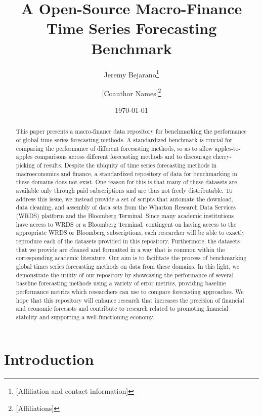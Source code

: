 \documentclass{article}
\title{A Open-Source Macro-Finance Time Series Forecasting Benchmark}
\author{Jeremy Bejarano\thanks{[Affiliation and contact information]} \and [Coauthor Names]\thanks{[Affiliations]}}
\date{\today}
\begin{document}
\maketitle

\begin{abstract}
This paper presents a macro-finance data repository for benchmarking the
performance of global time series forecasting methods. A standardized benchmark
is crucial for comparing the performance of different forecasting methods, so as
to allow apples-to-apples comparisons across different forecasting methods and
to discourage cherry-picking of results. Despite the ubiquity of time series
forecasting methods in macroeconomics and finance, a standardized repository of
data for benchmarking in these domains does not exist. One reason for this is
that many of these datasets are available only through paid subscriptions and
are thus not freely distributable. To address this issue, we instead provide a
set of scripts that automate the download, data cleaning, and assembly of data
sets from the Wharton Research Data Services (WRDS) platform and the Bloomberg
Terminal. Since many academic institutions have access to WRDS or a Bloomberg
Terminal, contingent on having access to the appropriate WRDS or Bloomberg
subscriptions, each researcher will be able to exactly reproduce each of the
datasets provided in this repository. Furthermore, the datasets that we provide
are cleaned and formatted in a way that is common within the corresponding
academic literature. Our aim is to facilitate the process of benchmarking global
times series forecasting methods on data from these domains. In this light, we
demonstrate the utility of our repository by showcasing the performance of
several baseline forecasting methods using a variety of error metrics, providing
baseline performance metrics which researchers can use to compare forecasting
approaches. We hope that this repository will enhance research
that increases the precision of financial and economic forecasts and contribute
to research related to promoting financial stability and supporting a
well-functioning economy.
\end{abstract}

\section{Introduction}
\label{sec:introduction}

\end{document}
